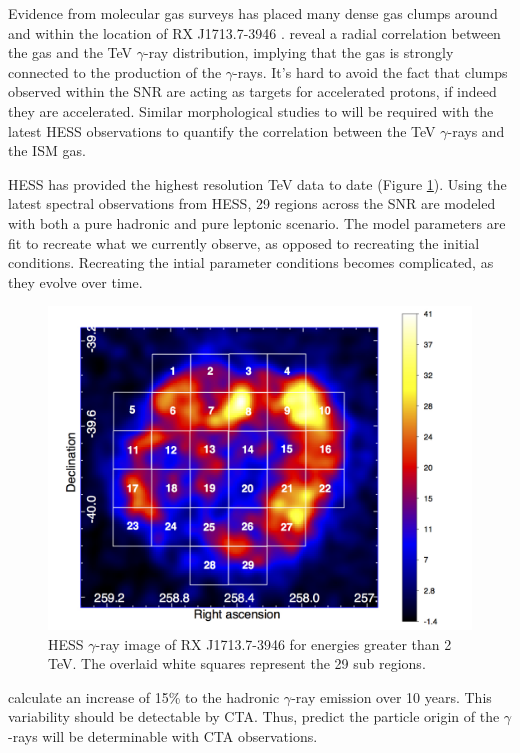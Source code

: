 \documentclass[12pt,a4paper]{article}
\begin{document}
Evidence from molecular gas surveys has placed many dense gas clumps around and within the location of RX J1713.7-3946 \citep{2003PASJ...55L..61F,2005ApJ...631..947M,2010ApJ...724...59S,2013PASA...30...55M}.
\cite{2012ApJ...746...82F} reveal a radial correlation between the gas and the TeV $\gamma$-ray distribution, implying that the gas is strongly connected to the production of the $\gamma$-rays.
It's hard to avoid the fact that clumps observed within the SNR are acting as targets for accelerated protons, if indeed they are accelerated.
Similar morphological studies to \cite{2015ApJ...799..175S} will be required with the latest HESS observations \citep{2018A&A...612A...6H} to quantify the correlation between the TeV $\gamma$-rays and the ISM gas.

HESS has provided the highest resolution TeV data to date (Figure \ref{fig:hesssubregions}).
Using the latest spectral observations from HESS, 29 regions across the SNR are modeled with both a pure hadronic and pure leptonic scenario. 
The model parameters are fit to recreate what we currently observe, as opposed to recreating the initial conditions.
Recreating the intial parameter conditions becomes complicated, as they evolve over time.
\begin{figure}[H]
	\centering
	\includegraphics[width=0.7\linewidth, height=0.34\textheight]{HESS_subregions}
	\caption{HESS $\gamma$-ray image of RX J1713.7-3946 for energies greater than 2 TeV. The overlaid white squares represent the 29 sub regions.}
	\label{fig:hesssubregions}
\end{figure}
\cite{2015A&A...577A..12F} calculate an increase of 15\% to the hadronic $\gamma$-ray emission over 10 years. This variability should be detectable by CTA.
Thus, \cite{2017ApJ...840...74A} predict the particle origin of the $\gamma$-rays will be determinable with CTA observations.
\end{document}
